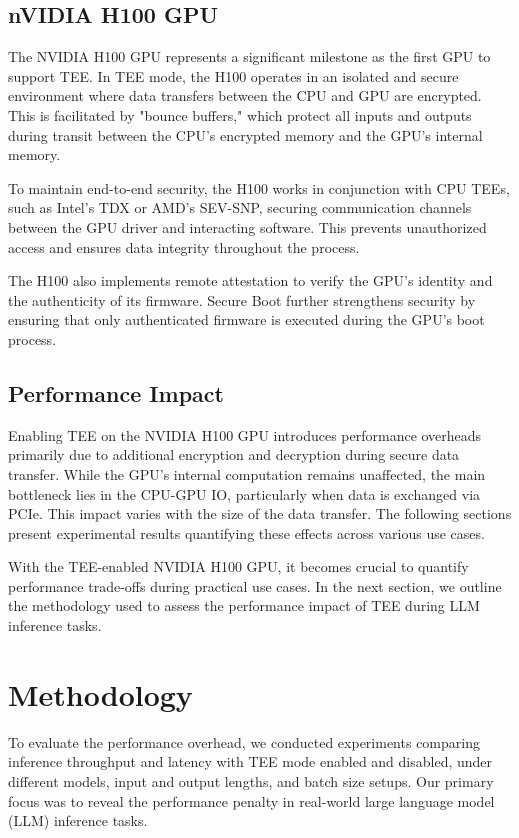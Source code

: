 \documentclass{article}
\begin{document}
\subsection{nVIDIA H100 GPU}

The NVIDIA H100 GPU represents a significant milestone as the first GPU to support TEE. In TEE mode, the H100 operates in an isolated and secure environment where data transfers between the CPU and GPU are encrypted. This is facilitated by "bounce buffers," which protect all inputs and outputs during transit between the CPU’s encrypted memory and the GPU’s internal memory.

To maintain end-to-end security, the H100 works in conjunction with CPU TEEs, such as Intel’s TDX or AMD’s SEV-SNP, securing communication channels between the GPU driver and interacting software. This prevents unauthorized access and ensures data integrity throughout the process.

The H100 also implements remote attestation to verify the GPU’s identity and the authenticity of its firmware. Secure Boot further strengthens security by ensuring that only authenticated firmware is executed during the GPU’s boot process.

\subsection{Performance Impact}

Enabling TEE on the NVIDIA H100 GPU introduces performance overheads primarily due to additional encryption and decryption during secure data transfer. While the GPU’s internal computation remains unaffected, the main bottleneck lies in the CPU-GPU IO, particularly when data is exchanged via PCIe. This impact varies with the size of the data transfer. The following sections present experimental results quantifying these effects across various use cases.

With the TEE-enabled NVIDIA H100 GPU, it becomes crucial to quantify performance trade-offs during practical use cases. In the next section, we outline the methodology used to assess the performance impact of TEE during LLM inference tasks.

\section{Methodology}

To evaluate the performance overhead, we conducted experiments comparing inference throughput and latency with TEE mode enabled and disabled, under different models, input and output lengths, and batch size setups. Our primary focus was to reveal the performance penalty in real-world large language model (LLM) inference tasks.
\end{document}
